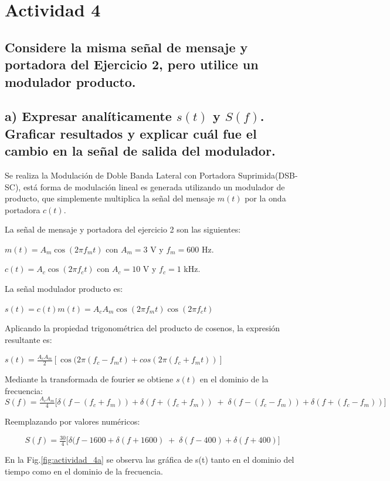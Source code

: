 \section{Actividad 4}

\subsection*{Considere la misma señal de mensaje y portadora del Ejercicio 2, pero utilice un modulador producto.} 

\subsection*{a) Expresar analíticamente $s(t)$ y $S(f)$. Graficar resultados y explicar cuál fue el cambio en la señal de salida del modulador.}
\bigskip

Se realiza la Modulación de Doble Banda Lateral con Portadora Suprimida(DSB-SC), está forma de modulación lineal es generada utilizando un modulador de producto, que simplemente multiplica la señal del mensaje $m(t)$ por la onda portadora $c(t)$.
\bigskip
\bigskip

La señal de mensaje y portadora del ejercicio 2 son las siguientes:
\bigskip

$m(t)=A_m\cos(2\pi f_m t)$ con $A_m=3$ V y $f_m=600$ Hz. 

$c(t)=A_c\cos(2\pi f_c t)$ con $A_c=10$ V y $f_c=1$ kHz.
\bigskip

La señal modulador producto es:
\bigskip

$s(t)=c(t) m(t)=A_c A_m\cos(2\pi f_m t) \cos(2\pi f_c t)$ 
\bigskip

Aplicando la propiedad trigonométrica del producto de cosenos, la expresión resultante es:
\bigskip

$s(t)=\frac{A_c A_m}{2}[\cos(2\pi (f_c-f_m t)+cos(2\pi (f_c+f_m t))]$ 
\bigskip

Mediante la transformada de fourier se obtiene $s(t)$ en el dominio de la frecuencia:
\[
S(f)=\tfrac{A_c A_m}{4}\big[\delta(f-(f_c+f_m))+\delta(f+(f_c+f_m))  \;+\; \delta(f-(f_c-f_m))+\delta(f+(f_c-f_m))\big]
\]

Reemplazando por valores numéricos:

\[
S(f)=\tfrac{30}{4}\big[\delta(f-1600+\delta(f+1600)  \;+\; \delta(f-400)+\delta(f+400)\big]
\]

En la Fig.\ref{fig:actividad_4a}  se observa las gráfica de s(t) tanto en el dominio del tiempo como en el dominio de la frecuencia.


